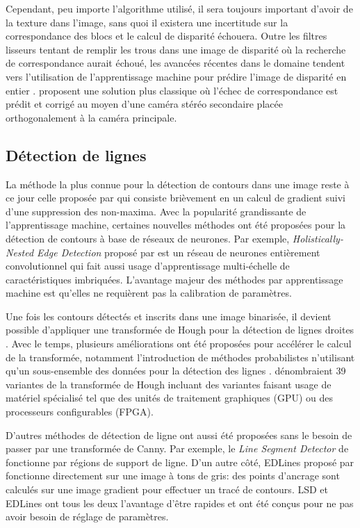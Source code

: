 Cependant, peu importe l'algorithme utilisé, il sera toujours important d'avoir de la texture dans l'image, sans quoi il existera une incertitude sur la correspondance des blocs et le calcul de disparité échouera. Outre les filtres lisseurs tentant de remplir les trous dans une image de disparité où la recherche de correspondance aurait échoué, les avancées récentes dans le domaine tendent vers l'utilisation de l'apprentissage machine pour prédire l'image de disparité en entier \citep{Kendall_2017_ICCV}. \cite{meier2017real} proposent une solution plus classique où l'échec de correspondance est prédit et corrigé au moyen d'une caméra stéréo secondaire placée orthogonalement à la caméra principale.

\subsection{Détection de lignes}

La méthode la plus connue pour la détection de contours dans une image reste à ce jour celle proposée par \citep{Canny1986} qui consiste brièvement en un calcul de gradient suivi d'une suppression des non-maxima. Avec la popularité grandissante de l'apprentissage machine, certaines nouvelles méthodes ont été proposées pour la détection de contours à base de réseaux de neurones. Par exemple, \textit{Holistically-Nested Edge Detection} proposé par \cite{Xie2015} est un réseau de neurones entièrement convolutionnel qui fait aussi usage d'apprentissage multi-échelle de caractéristiques imbriquées. L'avantage majeur des méthodes par apprentissage machine est qu'elles ne requièrent pas la calibration de paramètres.

Une fois les contours détectés et inscrits dans une image binarisée, il devient possible d'appliquer une transformée de Hough pour la détection de lignes droites \citep{Duda1972}. Avec le temps, plusieurs améliorations ont été proposées pour accélérer le calcul de la transformée, notamment l'introduction de méthodes probabilistes n'utilisant qu'un sous-ensemble des données pour la détection des lignes \citep{Matas2000}. \cite{Herout2013} dénombraient 39 variantes de la transformée de Hough incluant des variantes faisant usage de matériel spécialisé tel que des unités de traitement graphiques (GPU) ou des processeurs configurables (FPGA).

D'autres méthodes de détection de ligne ont aussi été proposées sans le besoin de passer par une transformée de Canny. Par exemple, le \textit{Line Segment Detector} de \citep{Gioi2012lsd} fonctionne par régions de support de ligne. D'un autre côté, EDLines proposé par \citep{AKINLAR20111633} fonctionne directement sur une image à tons de gris: des points d'ancrage sont calculés sur une image gradient pour effectuer un tracé de contours. LSD et EDLines ont tous les deux l'avantage d'être rapides et ont été conçus pour ne pas avoir besoin de réglage de paramètres.

